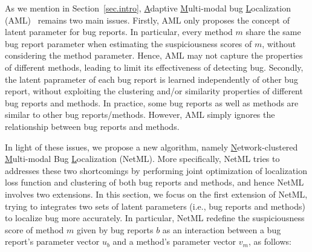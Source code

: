 %

As we mention in Section~\ref{sec.intro}, \underline{A}daptive \underline{M}ulti-modal bug \underline{L}ocalization (AML)~\cite{Le:2015:IRS:2786805.2786880} remains two main issues. Firstly, AML only proposes the concept of latent parameter for bug reports. In particular, every method $m$ share the same bug report parameter when estimating the suspiciousness scores of $m$, without considering the method parameter. Hence, AML may not capture the properties of different methods, leading to limit its effectiveness of detecting bug. Secondly, the latent paprameter of each bug report is learned independently of other bug report, without exploiting the clustering and/or similarity properties of different bug reports and methods. In practice, some bug reports as well as methods are similar to other bug reports/methods. However, AML simply ignores the relationship between bug reports and methods. 

In light of these issues, we propose a new algorithm, namely \underline{N}etwork-clustered \underline{M}ulti-modal Bug \underline{L}ocalization (NetML). More specifically, NetML tries to addresses these two shortcomings by performing joint optimization of localization loss function and clustering of both bug reports and methods, and hence NetML involves two extensions. In this section, we focus on the first extension of NetML, trying to integrates two sets of latent parameters (i.e., bug reports and methods) to localize bug more accurately. In particular, NetML redefine the suspiciousness score of method $m$ given by bug reports $b$ as an interaction between a bug report’s parameter vector $u_b$ and a method’s parameter vector $v_m$, as follows:


